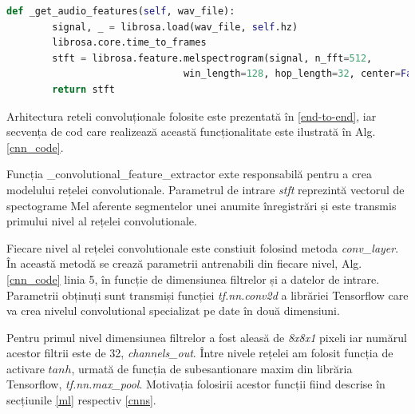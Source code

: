 \documentclass[a4paper,12pt]{book}
\begin{document}
				\begin{lstlisting}[language=Python, caption={Extragerea spectogramei Mel, 3.4.1, folosind libraria librosa.}, xleftmargin=0cm]
  def _get_audio_features(self, wav_file):
		signal, _ = librosa.load(wav_file, self.hz)
		librosa.core.time_to_frames
		stft = librosa.feature.melspectrogram(signal, n_fft=512, 
							   win_length=128, hop_length=32, center=False)
		return stft	\end{lstlisting} \par
				Arhitectura reteli convoluționale folosite este prezentată în \ref{end-to-end}, iar secvența de cod care realizează această funcționalitate este ilustrată în Alg. \ref{cnn_code}. \par 
				Funcția \_convolutional\_feature\_extractor exte responsabilă pentru a crea modelului rețelei convolutionale. Parametrul de intrare \textit{stft} reprezintă vectorul de spectograme Mel aferente segmentelor unei anumite înregistrări și este transmis primului nivel al rețelei convolutionale. \par
				Fiecare nivel al rețelei convolutionale este constiuit folosind metoda \textit{conv\_layer}. În această metodă se crează parametrii antrenabili din fiecare nivel, Alg.\ref{cnn_code} linia 5, în funcție de dimensiunea filtrelor și a datelor de intrare. Parametrii obținuți sunt transmiși funcției \textit{tf.nn.conv2d} a librăriei Tensorflow care va crea nivelul convolutional specializat pe date în două dimensiuni. \par
				Pentru primul nivel dimensiunea filtrelor a fost aleasă de \textit{8x8x1} pixeli iar numărul acestor filtrii este de 32, \textit{channels\_out}. Între nivele rețelei am folosit funcția de activare $tanh$, urmată de funcția de subesantionare maxim din librăria Tensorflow, \textit{tf.nn.max\_pool}. Motivația folosirii acestor funcții fiind descrise în secțiunile \ref{ml} respectiv \ref{cnns}.
				
\end{document}
